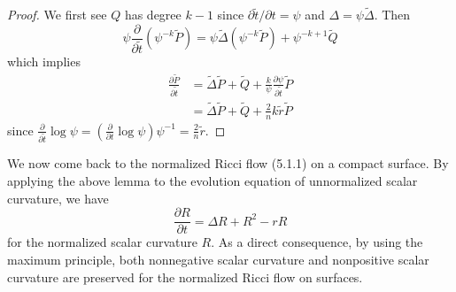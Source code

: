 \begin{proof}
We first see $Q$ has degree $k-1$ since $\partial
\tilde{t}/\partial{t}=\psi$ and $\Delta=\psi\tilde{\Delta}$. Then
$$
\psi\frac{\partial}{\partial \tilde{t}}(\psi^{-k}\tilde{P})
=\psi\tilde{\Delta}(\psi^{-k}\tilde{P})+\psi^{-k+1}\tilde{Q}
$$
which implies
\begin{align*}
\frac{\partial \tilde{P}}{\partial \tilde{t}}&  =\tilde{\Delta}
\tilde{P}+\tilde{Q}+\frac{k}{\psi}\frac{\partial \psi}{\partial
\tilde{t}}\tilde{P}\\
&  = \tilde{\Delta}
\tilde{P}+\tilde{Q}+\frac{2}{n}k\tilde{r}\tilde{P}
\end{align*}
since $\frac{\partial}{\partial\tilde{t}}\log\psi
=(\frac{\partial}{\partial t}\log\psi)\psi^{-1}
=\frac{2}{n}\tilde{r}.$
\end{proof}

We now come back to the normalized Ricci flow (5.1.1) on a compact
surface. By applying the above lemma to the evolution equation of
unnormalized scalar curvature, we have \begin{equation}
\frac{\partial R}{\partial t}=\Delta R+R^2-rR %
\end{equation} for the normalized scalar curvature $R$. As a direct
consequence, by using the maximum principle, both nonnegative
scalar curvature and nonpositive scalar curvature are preserved
for the normalized Ricci flow on surfaces.


